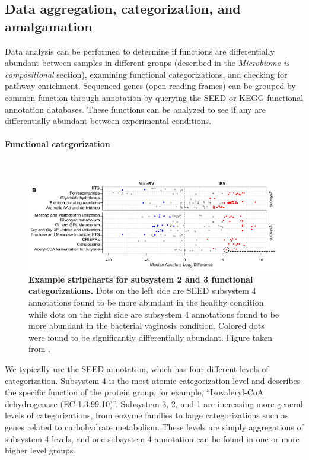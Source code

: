 \subsection{Data aggregation, categorization, and amalgamation}
Data analysis can be performed to determine if functions are differentially abundant between samples in different groups (described in the \textit{Microbiome is compositional} section), examining functional categorizations, and checking for pathway enrichment. Sequenced genes (open reading frames) can be grouped by common function through annotation by querying the SEED or KEGG functional annotation databases. These functions can be analyzed to see if any are differentially abundant between experimental conditions.

\paragraph{Functional categorization}\mbox{}\\

\begin{figure}[h]
\begin{center}
\includegraphics[width=\textwidth]{stripchart.png}
\caption[Example stripcharts for subsystem 2 and 3 functional categorizations.]{\textbf{Example stripcharts for subsystem 2 and 3 functional categorizations.} Dots on the left side are SEED subsystem 4 annotations found to be more abundant in the healthy condition while dots on the right side are subsystem 4 annotations found to be more abundant in the bacterial vaginosis condition. Colored dots were found to be significantly differentially abundant. Figure taken from \cite{macklaim2013comparative}.}
\label{stripchart_example}
\end{center}
\end{figure}

We typically use the SEED annotation, which has four different levels of categorization. Subsystem 4 is the most atomic categorization level and describes the specific function of the protein group, for example, “Isovaleryl-CoA dehydrogenase (EC 1.3.99.10)”. Subsystem 3, 2, and 1 are increasing more general levels of categorizations, from enzyme families to large categorizations such as genes related to carbohydrate metabolism. These levels are simply aggregations of subsystem 4 levels, and one subsystem 4 annotation can be found in one or more higher level groups.

